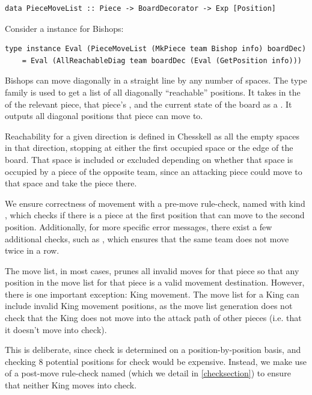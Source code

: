 \begin{lstlisting}
data PieceMoveList :: Piece -> BoardDecorator -> Exp [Position]
\end{lstlisting}

Consider a  instance for Bishops:

\begin{lstlisting}
type instance Eval (PieceMoveList (MkPiece team Bishop info) boardDec)
    = Eval (AllReachableDiag team boardDec (Eval (GetPosition info)))
\end{lstlisting}

Bishops can move diagonally in a straight line by any number of spaces. The type family  is used to get a list of all diagonally ``reachable'' positions. It takes in the  of the relevant piece, that piece's , and the current state of the board as a . It outputs all diagonal positions that piece can move to.

Reachability for a given direction is defined in Chesskell as all the empty spaces in that direction, stopping at either the first occupied space or the edge of the board. That space is included or excluded depending on whether that space is occupied by a piece of the opposite team, since an attacking piece could move to that space and take the piece there.

We ensure correctness of movement with a pre-move rule-check, named  with kind , which checks if there is a piece at the first position that can move to the second position. Additionally, for more specific error messages, there exist a few additional checks, such as , which ensures that the same team does not move twice in a row.

The move list, in most cases, prunes all invalid moves for that piece so that any position in the move list for that piece is a valid movement destination. However, there is one important exception: King movement. The move list for a King can include invalid King movement positions, as the move list generation does not check that the King does not move into the attack path of other pieces (i.e. that it doesn't move into check).

This is deliberate, since check is determined on a position-by-position basis, and checking 8 potential positions for check would be expensive. Instead, we make use of a post-move rule-check named  (which we detail in \cref{checksection}) to ensure that neither King moves into check.

